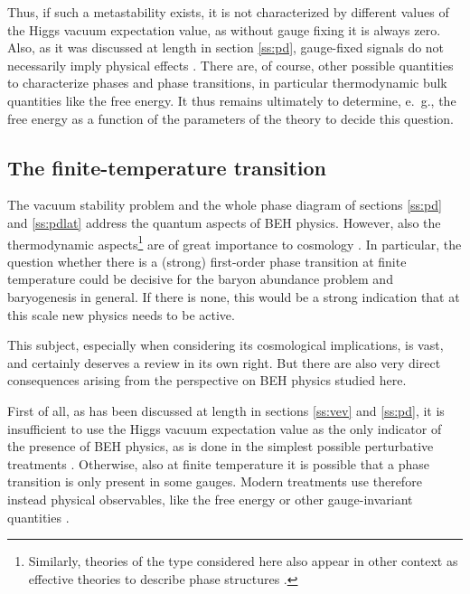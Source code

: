 \documentclass[final,twoside,12pt]{article}
\newcommand*{\1}{1\!\!\!\bot}
\begin{document}
Thus, if such a metastability exists, it is not characterized by different values of the Higgs vacuum expectation value, as without gauge fixing it is always zero. Also, as it was discussed at length in section \ref{ss:pd}, gauge-fixed signals do not necessarily imply physical effects \cite{Caudy:2007sf}. There are, of course, other possible quantities to characterize phases and phase transitions, in particular thermodynamic bulk quantities like the free energy. It thus remains ultimately to determine, e.\ g., the free energy as a function of the parameters of the theory to decide this question.

\subsection{The finite-temperature transition}\label{ss:ft}

The vacuum stability problem and the whole phase diagram of sections \ref{ss:pd} and \ref{ss:pdlat} address the quantum aspects of BEH physics. However, also the thermodynamic aspects\footnote{Similarly, theories of the type considered here also appear in other context as effective theories to describe phase structures \cite{Yamamoto:2018}.} are of great importance to cosmology \cite{Kapusta:2006pm,Dolgov:2006xi,Morrissey:2009tf}. In particular, the question whether there is a (strong) first-order phase transition at finite temperature could be decisive for the baryon abundance problem and baryogenesis in general. If there is none, this would be a strong indication that at this scale new physics needs to be active.

This subject, especially when considering its cosmological implications, is vast, and certainly deserves a review in its own right. But there are also very direct consequences arising from the perspective on BEH physics studied here.

First of all, as has been discussed at length in sections \ref{ss:vev} and \ref{ss:pd}, it is insufficient to use the Higgs vacuum expectation value as the only indicator of the presence of BEH physics, as is done in the simplest possible perturbative treatments \cite{Kapusta:2006pm}. Otherwise, also at finite temperature it is possible that a phase transition is only present in some gauges. Modern treatments use therefore instead physical observables, like the free energy or other gauge-invariant quantities \cite{DOnofrio:2015gop,Laine:2015kra,Wellegehausen:2011sc,Reichert:2017puo}.
\end{document}
